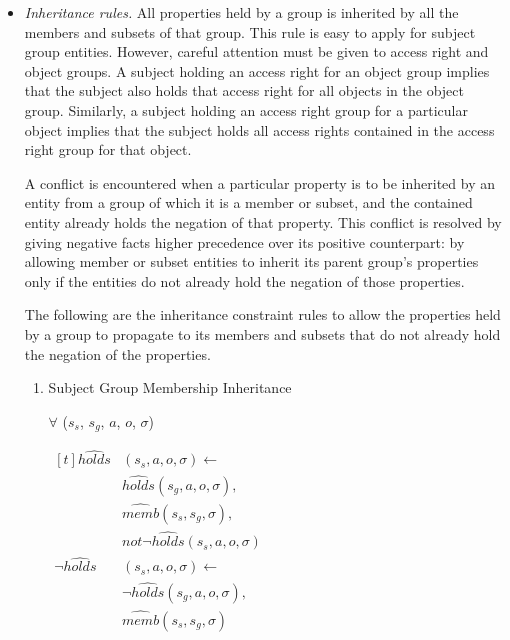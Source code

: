 \documentclass[global,twocolumn,draft]{svjour}
\begin{document}
          \begin{itemize}
            \item
              {\em Inheritance rules.}
              All properties held by a group is inherited by all the members
              and subsets of that group. This rule is easy to apply for subject
              group entities. However, careful attention must be given to access
              right and object groups. A subject holding an access right for an
              object group implies that the subject also holds that access
              right for all objects in the object group. Similarly, a subject
              holding an access right group for a particular object implies
              that the subject holds all access rights contained in the access
              right group for that object.

              A conflict is encountered when a particular property is to be
              inherited by an entity from a group of which it is a member or
              subset, and the contained entity already holds the negation of
              that property. This conflict is resolved by giving negative facts
              higher precedence over its positive counterpart: by allowing
              member or subset entities to inherit its parent group's
              properties only if the entities do not already hold the negation
              of those properties.

              The following are the inheritance constraint rules to allow the
              properties held by a group to propagate to its members and
              subsets that do not already hold the negation of the properties.

              \begin{enumerate}
                \item
                  Subject Group Membership Inheritance

                  $\forall$ ($s_{s}$, $s_{g}$, $a$, $o$, $\sigma$)
 
                  \begin{math}
                    \begin{aligned}[t]
                      \hat{holds}&(s_{s}, a, o, \sigma) \leftarrow \\
                      & \hat{holds}(s_{g}, a, o, \sigma), \\
                      & \hat{memb}(s_{s}, s_{g}, \sigma), \\
                      & not \lnot \hat{holds}(s_{s}, a, o, \sigma) \\
                      \lnot \hat{holds}&(s_{s}, a, o, \sigma) \leftarrow \\
                      & \lnot \hat{holds}(s_{g}, a, o, \sigma), \\
                      & \hat{memb}(s_{s}, s_{g}, \sigma)
                    \end{aligned}
                  \end{math}


\end{enumerate}
\end{itemize}
\end{document}
